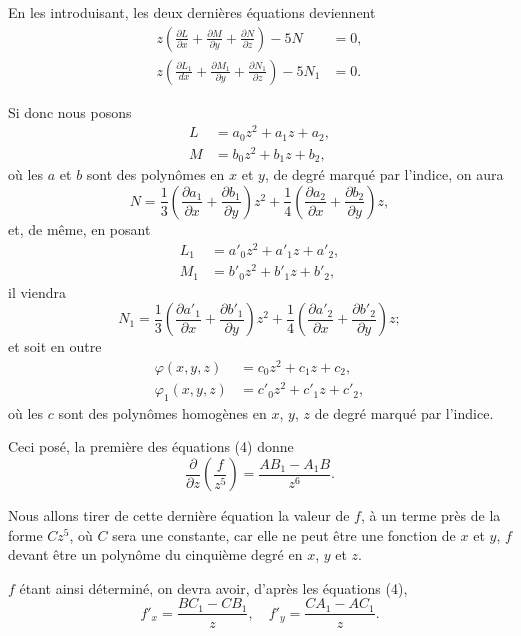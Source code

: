 \documentclass{article}
\begin{document}

En les introduisant, les deux dernières équations deviennent
\[
\begin{aligned}
z\left(\frac{\partial L}{\partial x} + \frac{\partial M}{\partial y} + \frac{\partial N}{\partial z}\right) - 5N &= 0, \\
z\left(\frac{\partial L_{1}}{dx} + \frac{\partial M_{1}}{\partial y} + \frac{\partial N_{1}}{\partial z}\right) - 5N_{1} &= 0.
\end{aligned}
\]

Si donc nous posons
\[
\begin{aligned}
L &= a_{0}z^{2} + a_{1}z + a_{2}, \\
M &= b_{0}z^{2} + b_{1}z + b_{2},
\end{aligned}
\]
où les $a$ et $b$ sont des polynômes en $x$ et $y$, de degré marqué par l'indice, on aura
\[
N = \frac{1}{3}\left(\frac{\partial a_{1}}{\partial x} + \frac{\partial b_{1}}{\partial y}\right)z^{2} + \frac{1}{4}\left(\frac{\partial a_{2}}{\partial x} + \frac{\partial b_{2}}{\partial y}\right)z,
\]
et, de même, en posant
\[
\begin{aligned}
L_{1} &= a'_{0}z^{2} + a'_{1}z + a'_{2}, \\
M_{1} &= b'_{0}z^{2} + b'_{1}z + b'_{2},
\end{aligned}
\]
il viendra
\[
N_{1} = \frac{1}{3}\left(\frac{\partial a'_{1}}{\partial x} + \frac{\partial b'_{1}}{\partial y}\right)z^{2} + \frac{1}{4}\left(\frac{\partial a'_{2}}{\partial x} + \frac{\partial b'_{2}}{\partial y}\right)z;
\]
et soit en outre
\[
\begin{aligned}
\varphi(x, y, z) &= c_{0}z^{2} + c_{1}z + c_{2}, \\
\varphi_{1}(x, y, z) &= c'_{0}z^{2} + c'_{1}z + c'_{2},
\end{aligned}
\]
où les $c$ sont des polynômes homogènes en $x$, $y$, $z$ de degré marqué par l'indice.

Ceci posé, la première des équations (4) donne
\[
\frac{\partial}{\partial z}\left(\frac{f}{z^{5}}\right) = \frac{AB_{1} - A_{1}B}{z^{6}}.
\]

Nous allons tirer de cette dernière équation la valeur de $f$, à un terme près de la forme $Cz^{5}$, où $C$ sera une constante, car elle ne peut être une fonction de $x$ et $y$, $f$ devant être un polynôme du cinquième degré en $x$, $y$ et $z$.


$f$ étant ainsi déterminé, on devra avoir, d'après les équations (4),
\[
f'_{x} = \frac{BC_{1} - CB_{1}}{z}, \quad f'_{y} = \frac{CA_{1} - AC_{1}}{z}.
\]
\end{document}
